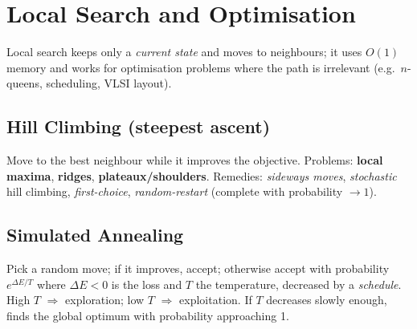 \section{Local Search and Optimisation}
Local search keeps only a \emph{current state} and moves to neighbours; it uses $O(1)$ memory and works for optimisation problems where the path is irrelevant (e.g.\ $n$-queens, scheduling, VLSI layout).

\subsection{Hill Climbing (steepest ascent)}
Move to the best neighbour while it improves the objective. Problems: \textbf{local maxima}, \textbf{ridges}, \textbf{plateaux/shoulders}. Remedies: \emph{sideways moves}, \emph{stochastic} hill climbing, \emph{first-choice}, \emph{random-restart} (complete with probability $\to1$).
\begin{center}
\end{center}

\subsection{Simulated Annealing}
Pick a random move; if it improves, accept; otherwise accept with probability $e^{\Delta E/T}$ where $\Delta E<0$ is the loss and $T$ the temperature, decreased by a \emph{schedule}. High $T$ $\Rightarrow$ exploration; low $T$ $\Rightarrow$ exploitation. If $T$ decreases slowly enough, finds the global optimum with probability approaching 1.

